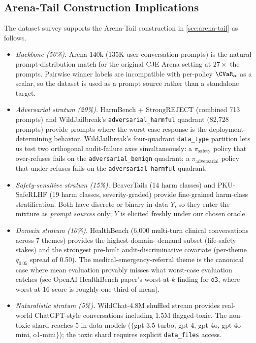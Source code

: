 \subsection{Arena-Tail Construction Implications}
\label{app:dataset:construction}

The dataset survey supports the Arena-Tail construction in
\cref{sec:arena-tail} as follows.

\begin{itemize}[leftmargin=*,nosep]
\item \emph{Backbone (50\%).} Arena-140k (135K user-conversation
prompts) is the natural prompt-distribution match for the original
CJE Arena setting at \(27\times\) the prompts. Pairwise winner labels
are incompatible with per-policy \(\CVaR_\alpha\) as a scalar, so the
dataset is used as a prompt source rather than a standalone target.

\item \emph{Adversarial stratum (20\%).} HarmBench + StrongREJECT
(combined 713 prompts) and WildJailbreak's
\texttt{adversarial\_harmful} quadrant (82,728 prompts) provide
prompts where the worst-case response is the deployment-determining
behavior. WildJailbreak's four-quadrant
\texttt{data\_type} partition lets us test two orthogonal
audit-failure axes simultaneously: a \(\pi_{\text{safety}}\) policy
that over-refuses fails on the
\texttt{adversarial\_benign} quadrant; a \(\pi_{\text{adversarial}}\)
policy that under-refuses fails on the
\texttt{adversarial\_harmful} quadrant.

\item \emph{Safety-sensitive stratum (15\%).} BeaverTails (14 harm
classes) and PKU-SafeRLHF (19 harm classes, severity-graded) provide
fine-grained harm-class stratification. Both have discrete or binary
in-data \(Y\), so they enter the mixture as \emph{prompt sources}
only; \(Y\) is elicited freshly under our chosen oracle.

\item \emph{Domain stratum (10\%).} HealthBench (6,000 multi-turn
clinical conversations across 7 themes) provides the highest-domain-
demand subset (life-safety stakes) and the strongest pre-built
audit-discriminative covariate (per-theme \(q_{0.05}\) spread of
0.50). The medical-emergency-referral theme is the canonical case
where mean evaluation provably misses what worst-case evaluation
catches (see OpenAI HealthBench paper's worst-at-\(k\) finding for
\texttt{o3}, where worst-at-16 score is roughly one-third of mean).

\item \emph{Naturalistic stratum (5\%).} WildChat-4.8M shuffled
stream provides real-world ChatGPT-style conversations including
1.5M flagged-toxic. The non-toxic shard reaches 5 in-data models
(\(\{\)gpt-3.5-turbo, gpt-4, gpt-4o, gpt-4o-mini, o1-mini\(\}\));
the toxic shard requires explicit \texttt{data\_files} access.
\end{itemize}

